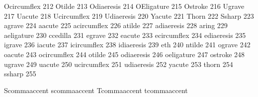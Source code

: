  Ocircumflex     212 %
 Otilde          213 %
 Odiaeresis      214 %
 OEligature      215 %
 Ostroke         216 %
 Ugrave          217 %
 Uacute          218 %
 Ucircumflex     219 %
 Udiaeresis      220 %
 Yacute          221 %
 Thorn           222 %
 Ssharp          223 %
 agrave          224 %
 aacute          225 %
 acircumflex     226 %
 atilde          227 %
 adiaeresis      228 %
 aring           229 %
 aeligature      230 %
 ccedilla        231 %
 egrave          232 %
 eacute          233 %
 ecircumflex     234 %
 ediaeresis      235 %
 igrave          236 %
 iacute          237 %
 icircumflex     238 %
 idiaeresis      239 %
 eth             240 %
 ntilde          241 %
 ograve          242 %
 oacute          243 %
 ocircumflex     244 %
 otilde          245 %
 odiaeresis      246 %
 oeligature      247 %
 ostroke         248 %
 ugrave          249 %
 uacute          250 %
 ucircumflex     251 %
 udiaeresis      252 %
 yacute          253 %
 thorn           254 %
 ssharp          255 %

\stopencoding

\startencoding[ec]

 Scommaaccent {\Scedilla}
 scommaaccent {\scedilla}
 Tcommaaccent {\Tcedilla}
 tcommaaccent {\tcedilla}

\stopencoding

\endinput

